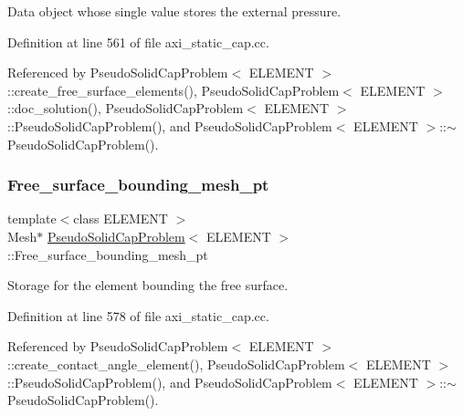 Data object whose single value stores the external pressure. 



Definition at line 561 of file axi\+\_\+static\+\_\+cap.\+cc.



Referenced by Pseudo\+Solid\+Cap\+Problem$<$ E\+L\+E\+M\+E\+N\+T $>$\+::create\+\_\+free\+\_\+surface\+\_\+elements(), Pseudo\+Solid\+Cap\+Problem$<$ E\+L\+E\+M\+E\+N\+T $>$\+::doc\+\_\+solution(), Pseudo\+Solid\+Cap\+Problem$<$ E\+L\+E\+M\+E\+N\+T $>$\+::\+Pseudo\+Solid\+Cap\+Problem(), and Pseudo\+Solid\+Cap\+Problem$<$ E\+L\+E\+M\+E\+N\+T $>$\+::$\sim$\+Pseudo\+Solid\+Cap\+Problem().

\mbox{\label{classPseudoSolidCapProblem_a3e45f375f3aa934391ca8e20e11410e4}} 
\subsubsection{\texorpdfstring{Free\+\_\+surface\+\_\+bounding\+\_\+mesh\+\_\+pt}{Free\_surface\_bounding\_mesh\_pt}}
{\footnotesize\ttfamily template$<$class E\+L\+E\+M\+E\+NT $>$ \\
Mesh$\ast$ \hyperlink{classPseudoSolidCapProblem}{Pseudo\+Solid\+Cap\+Problem}$<$ E\+L\+E\+M\+E\+NT $>$\+::Free\+\_\+surface\+\_\+bounding\+\_\+mesh\+\_\+pt\hspace{0.3cm}{\ttfamily [private]}}



Storage for the element bounding the free surface. 



Definition at line 578 of file axi\+\_\+static\+\_\+cap.\+cc.



Referenced by Pseudo\+Solid\+Cap\+Problem$<$ E\+L\+E\+M\+E\+N\+T $>$\+::create\+\_\+contact\+\_\+angle\+\_\+element(), Pseudo\+Solid\+Cap\+Problem$<$ E\+L\+E\+M\+E\+N\+T $>$\+::\+Pseudo\+Solid\+Cap\+Problem(), and Pseudo\+Solid\+Cap\+Problem$<$ E\+L\+E\+M\+E\+N\+T $>$\+::$\sim$\+Pseudo\+Solid\+Cap\+Problem().

\mbox{\label{classPseudoSolidCapProblem_ab334d082c008553389374a90f732df2f}} 

